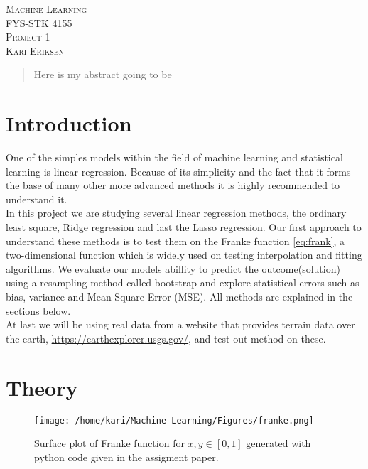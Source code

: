 \documentclass[a4paper,12pt, english]{article}
\begin{document}
\begin{titlepage}
\begin{center}
\textsc{\Large Machine Learning}\\[0.2cm]
\textsc{FYS-STK 4155}\\[1.0cm]
\textsc{\Large Project 1}\\[0.2cm]
\textsc{Kari Eriksen}\\[1.0cm]

\begin{abstract}
Here is my abstract going to be
\end{abstract}

\end{center}
\end{titlepage}

\section*{Introduction}

One of the simples models within the field of machine learning and statistical learning is linear regression. Because of its simplicity and the fact that it forms the base of many other more advanced methods it is highly recommended to understand it. \\ 
In this project we are studying several linear regression methods, the ordinary least square, Ridge regression and last the Lasso regression. Our first approach to understand these methods is to test them on the Franke function \ref{eq:frank}, a two-dimensional function which is widely used on testing interpolation and fitting algorithms. 
We evaluate our models abillity to predict the outcome(solution) using a resampling method called bootstrap and explore statistical errors such as bias, variance and Mean Square Error (MSE). All methods are explained in the sections below. \\
At last we will be using real data from a website that provides terrain data over the earth, \href{https://earthexplorer.usgs.gov/}{https://earthexplorer.usgs.gov/}, and test out method on these. 

 

\section*{Theory}

\begin{figure}
\centering
\texttt{[image: /home/kari/Machine-Learning/Figures/franke.png]}
\caption{Surface plot of Franke function for $x, y \in [0,1]$ generated with python code given in the assigment paper.}
\label{fig:franke}
\end{figure}
\end{document}
